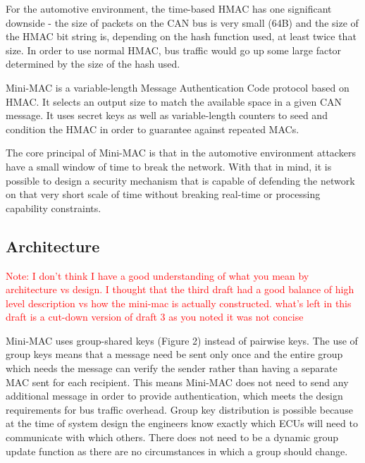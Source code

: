 For the automotive environment, the time-based HMAC has one significant downside - the size of packets on the CAN bus is very small (64B) and the size of the HMAC bit string is, depending on the hash function used, at least twice that size. In order to use normal HMAC, bus traffic would go up some large factor determined by the size of the hash used. 

Mini-MAC is a variable-length Message Authentication Code protocol based on HMAC. It selects an output size to match the available space in a given CAN message. It uses secret keys as well as variable-length counters to seed and condition the HMAC in order to guarantee against repeated MACs.

The core principal of Mini-MAC is that in the automotive environment attackers have a small window of time to break the network. With that in mind, it is possible to design a security mechanism that is capable of defending the network on that very short scale of time without breaking real-time or processing capability constraints.

\subsection{Architecture}

\textcolor{red}{Note: I don't think I have a good understanding of what you mean by architecture vs design. I thought that the third draft had a good balance of high level description vs how the mini-mac is actually constructed. what's left in this draft is a cut-down version of draft 3 as you noted it was not concise}

Mini-MAC uses group-shared keys (Figure 2) instead of pairwise keys. The use of group keys means that a message need be sent only once and the entire group which needs the message can verify the sender rather than having a separate MAC sent for each recipient. This means Mini-MAC does not need to send any additional message in order to provide authentication, which meets the design requirements for bus traffic overhead. Group key distribution is possible because at the time of system design the engineers know exactly which ECUs will need to communicate with which others. There does not need to be a dynamic group update function as there are no circumstances in which a group should change.

